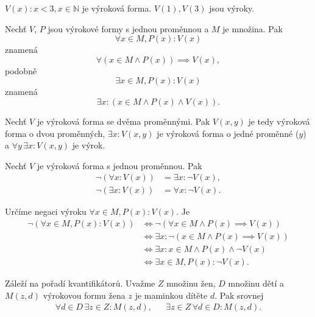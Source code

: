 \begin{priklad}
	$V(x):x<3, x \in \mathbb N $ je výroková forma. $V(1), V(3)$ jsou výroky.
\end{priklad}

\begin{oznaceni}
	Nechť $V$, $P$ jsou výrokové formy s jednou proměnnou a $M$ je množina. Pak
	$$
	\forall x \in M,P(x):V(x)
	$$
	znamená
	$$
	    \forall (x\in M\land P(x))\implies V(x),
	$$
	podobně
	$$
	    \exists x \in M, P(x):V(x)
	$$
	znamená
	$$
	    \exists x: (x\in M\land P(x)\land V(x)).
	$$
\end{oznaceni}

\begin{poznamka}
	Nechť $V$ je výroková forma se dvěma proměnnými. Pak $V(x,y)$ je tedy výroková forma o dvou proměnných,
	$\exists x:V(x,y)$ je výroková forma o jedné proměnné ($y$) a $\forall y\, \exists x: V(x,y)$ je výrok.
\end{poznamka}

\begin{poznamka}
	Nechť $V$ je výroková forma s jednou proměnnou. Pak
	\begin{align*}
		\neg (\forall x : V(x)) &= \exists x: \neg V(x),\\
		\neg (\exists x: V(x)) &= \forall x: \neg V(x).
\end{align*}
\end{poznamka}

\begin{priklad}
	Určíme negaci výroku $\forall x \in M, P(x):V(x)$. Je
	\begin{align*}
	\neg (\forall x \in M, P(x):V(x)) &\iff \neg (\forall x \in M\land P(x)\implies V(x)) \\
	& \iff \exists x : \neg (x\in M\land P(x) \implies V(x)) \\
& \iff \exists x: x\in M\land P(x)\land \neg V(x) \\
	&\iff \exists x \in M, P(x):\neg V(x).
\end{align*}
\end{priklad}

\begin{poznamka}[Varování!]
	Záleží na pořadí kvantifikátorů. Uvažme $Z$ množinu žen, $D$ množinu dětí a $M(z,d)$ výrokovou formu žena $z$ je maminkou dítěte $d$. Pak srovnej
	\begin{align*}
	\forall d \in D \, \exists z \in Z: M(z,d), && \exists z \in Z \,\forall d\in D: M(z,d).
\end{align*}
\end{poznamka}


